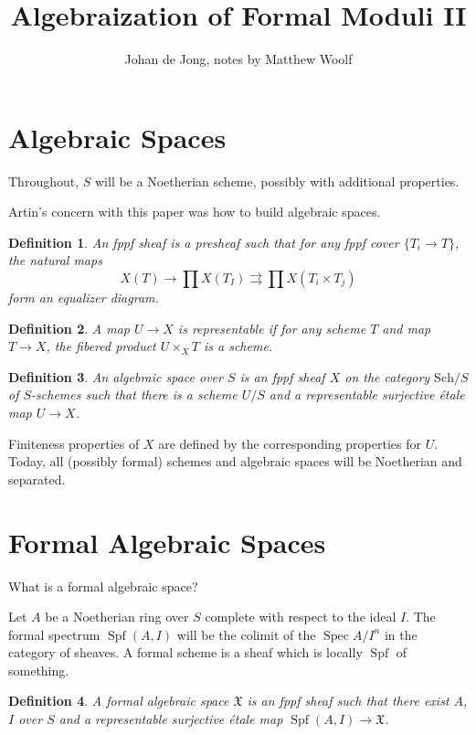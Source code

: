 \documentclass{amsart}
\title{Algebraization of Formal Moduli II}
\author{Johan de Jong, notes by Matthew Woolf}
\date{}
\newtheorem*{defn}{Definition}
\newcommand{\X}{\mathfrak{X}\xspace}
\DeclareMathOperator{\Spf}{Spf}
\DeclareMathOperator{\Spec}{Spec}
\begin{document}
\maketitle

\section{Algebraic Spaces}

Throughout, $S$ will be a Noetherian scheme, possibly with additional properties.

Artin's concern with this paper was how to build algebraic spaces.

\begin{defn}
An fppf sheaf is a presheaf such that for any fppf cover $\{T_i \to T\}$, the natural maps \[X(T) \to \prod X(T_I) \rightrightarrows \prod X(T_i \times T_j) \] form an equalizer diagram.
\end{defn}

\begin{defn}
A map $U \to X$ is representable if for any scheme $T$ and map $T \to X$, the fibered product $U \times_X T$ is a scheme.
\end{defn}

\begin{defn}
An algebraic space over $S$ is an fppf sheaf $X$ on the category $\mathrm{Sch}/S$ of $S$-schemes such that there is a scheme $U/S$ and a representable surjective \'etale map $U \to X$.
\end{defn}

Finiteness properties of $X$ are defined by the corresponding properties for $U$. Today, all (possibly formal) schemes and algebraic spaces will be Noetherian and separated.

\section{Formal Algebraic Spaces}

What is a formal algebraic space?

Let $A$ be a Noetherian ring over $S$ complete with respect to the ideal $I$. The formal spectrum $\Spf(A,I)$ will be the colimit of the $\Spec A/I^n$ in the category of sheaves. A formal scheme is a sheaf which is locally $\Spf$ of something.

\begin{defn} A formal algebraic space $\X$ is an fppf sheaf such that there exist $A$, $I$ over $S$ and a representable surjective \'etale map $\Spf(A,I) \to \X$.
\end{defn}
\end{document}
